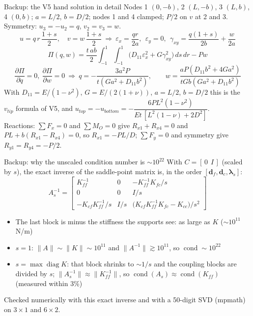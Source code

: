 \documentclass[aspectratio=169,10pt]{beamer}
\newcommand{\vd}{\mathbf d}
\newcommand{\vlam}{\bm{\lambda}}
\newcommand{\src}[1]{{\color{muted}\scriptsize #1}}
\begin{document}
\begin{frame}{Backup: the V5 hand solution in detail}
  Nodes 1 $(0,-b)$, 2 $(L,-b)$, 3 $(L,b)$, 4 $(0,b)$; $a=L/2$, $b=D/2$; nodes 1 and 4 clamped; $P/2$ on $v$ at 2 and 3.
  Symmetry: $u_3=-u_2=q$, $v_2=v_3=w$.
  \[
    u=q\,r\,\frac{1+s}{2},\quad v=w\,\frac{1+s}{2}\ \Rightarrow\
    \varepsilon_x=\frac{qr}{2a},\ \ \varepsilon_y=0,\ \ \gamma_{xy}=\frac{q(1+s)}{2b}+\frac{w}{2a}
  \]
  \[
    \Pi(q,w)=\frac{t\,ab}{2}\int_{-1}^{1}\!\!\int_{-1}^{1}\big(D_{11}\varepsilon_x^2+G\gamma_{xy}^2\big)\,ds\,dr-Pw
  \]
  \[
    \frac{\partial\Pi}{\partial q}=0,\ \frac{\partial\Pi}{\partial w}=0\ \Rightarrow\
    q=-\frac{3a^2P}{t(Ga^2+D_{11}b^2)},\qquad
    w=\frac{aP(D_{11}b^2+4Ga^2)}{tGb(Ga^2+D_{11}b^2)}
  \]
  With $D_{11}=E/(1-\nu^2)$, $G=E/(2(1+\nu))$, $a=L/2$, $b=D/2$ this is the $v_{tip}$ formula of V5, and
  $u_{top}=-u_{bottom}=-\dfrac{6PL^2(1-\nu^2)}{Et\,[L^2(1-\nu)+2D^2]}$.\\[4pt]
  Reactions: $\sum F_x=0$ and $\sum M_O=0$ give $R_{x1}+R_{x4}=0$ and $PL+b(R_{x1}-R_{x4})=0$, so $R_{x1}=-PL/D$;
  $\sum F_y=0$ and symmetry give $R_{y1}=R_{y4}=-P/2$.
\end{frame}

\begin{frame}{Backup: why the unscaled condition number is $\sim10^{22}$}
  With $C=[\,0\ \ I\,]$ (scaled by $s$), the exact inverse of the saddle-point matrix is, in the order $[\vd_f,\vd_c,\vlam_s]$:
  \[
    A_s^{-1}=\begin{bmatrix}
      K_{ff}^{-1} & 0 & -K_{ff}^{-1}K_{fc}/s\\
      0 & 0 & I/s\\
      -K_{cf}K_{ff}^{-1}/s & I/s & \big(K_{cf}K_{ff}^{-1}K_{fc}-K_{cc}\big)/s^2
    \end{bmatrix}
  \]
  \begin{itemize}
    \item The last block is minus the stiffness the supports see: as large as $K$ ($\sim10^{11}$ N/m)
    \item $s=1$: $\|A\|\sim\|K\|\sim10^{11}$ and $\|A^{-1}\|\gtrsim10^{11}$, so $\operatorname{cond}\sim10^{22}$
    \item $s=\max\operatorname{diag}K$: that block shrinks to $\sim1/s$ and the coupling blocks are divided by $s$;
          $\|A_s^{-1}\|\approx\|K_{ff}^{-1}\|$, so $\operatorname{cond}(A_s)\approx\operatorname{cond}(K_{ff})$
          (measured within 3\%)
  \end{itemize}
  \src{Checked numerically with this exact inverse and with a 50-digit SVD (mpmath) on $3\times1$ and $6\times2$.}
\end{frame}
\end{document}
